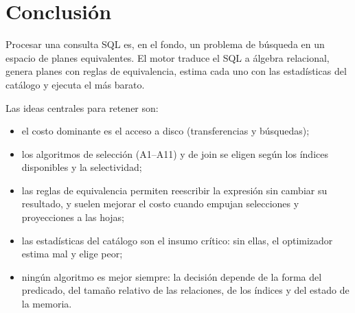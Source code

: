 \documentclass[11pt,a4paper]{article}
\begin{document}
\section{Conclusión}

Procesar una consulta SQL es, en el fondo, un problema de búsqueda en un
espacio de planes equivalentes. El motor traduce el SQL a álgebra relacional,
genera planes con reglas de equivalencia, estima cada uno con las estadísticas
del catálogo y ejecuta el más barato.

Las ideas centrales para retener son:

\begin{itemize}
    \item el costo dominante es el acceso a disco (transferencias y
    búsquedas);
    \item los algoritmos de selección (A1--A11) y de join se eligen según
    los índices disponibles y la selectividad;
    \item las reglas de equivalencia permiten reescribir la expresión sin
    cambiar su resultado, y suelen mejorar el costo cuando empujan
    selecciones y proyecciones a las hojas;
    \item las estadísticas del catálogo son el insumo crítico: sin ellas,
    el optimizador estima mal y elige peor;
    \item ningún algoritmo es mejor siempre: la decisión depende de la
    forma del predicado, del tamaño relativo de las relaciones, de los
    índices y del estado de la memoria.
\end{itemize}
\end{document}
